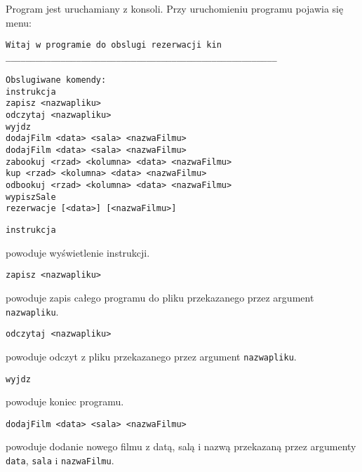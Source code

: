 \documentclass[12pt,a4paper,oneside]{article}
\begin{document}
Program jest uruchamiany z konsoli.
Przy uruchomieniu programu pojawia się menu:
\begin{verbatim}
Witaj w programie do obslugi rezerwacji kin           
______________________________________________________

Obslugiwane komendy:                                  
instrukcja                                            
zapisz <nazwapliku>                                   
odczytaj <nazwapliku>                                   
wyjdz                                                 
dodajFilm <data> <sala> <nazwaFilmu>                  
dodajFilm <data> <sala> <nazwaFilmu>                  
zabookuj <rzad> <kolumna> <data> <nazwaFilmu>         
kup <rzad> <kolumna> <data> <nazwaFilmu>              
odbookuj <rzad> <kolumna> <data> <nazwaFilmu>         
wypiszSale                                                 
rezerwacje [<data>] [<nazwaFilmu>]             

\end{verbatim}

\begin{Verbatim}[fontsize=\small]
instrukcja
\end{Verbatim}
powoduje wyświetlenie instrukcji. \newline

\begin{Verbatim}[fontsize=\small]
zapisz <nazwapliku>
\end{Verbatim}
powoduje zapis całego programu do pliku przekazanego przez argument \texttt{nazwapliku}. \newline

\begin{Verbatim}[fontsize=\small]
odczytaj <nazwapliku>
\end{Verbatim}
powoduje odczyt z pliku przekazanego przez argument \texttt{nazwapliku}. \newline

\begin{Verbatim}[fontsize=\small]
wyjdz
\end{Verbatim}
powoduje koniec programu. \newline

\begin{Verbatim}[fontsize=\small]
dodajFilm <data> <sala> <nazwaFilmu>                  
\end{Verbatim}
powoduje dodanie nowego filmu z datą, salą i nazwą przekazaną przez argumenty \texttt{data}, \texttt{sala} i \texttt{nazwaFilmu}. \newline
\end{document}

